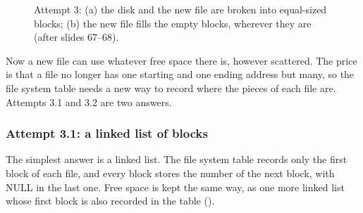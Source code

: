\begin{figure}[H]
\caption{Attempt 3: (a) the disk and the new file are broken into equal-sized blocks; (b) the new file fills the empty blocks, wherever they are (after slides 67--68).}
\label{fig:blocks}
\end{figure}
Now a new file can use whatever free space there is, however scattered. The price is that a file no longer has one starting and one ending address but many, so the file system table needs a new way to record where the pieces of each file are. Attempts 3.1 and 3.2 are two answers.

\subsubsection{Attempt 3.1: a linked list of blocks}
The simplest answer is a linked list. The file system table records only the first block of each file, and every block stores the number of the next block, with NULL in the last one. Free space is kept the same way, as one more linked list whose first block is also recorded in the table ().

